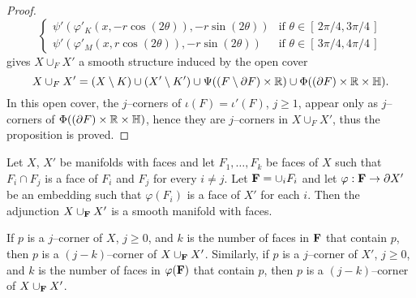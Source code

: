 \begin{proof}
\[\begin{cases}
			\psi'(\varphi'_K(x,-r\cos(2\theta)),-r\sin(2\theta))				
				&	\mbox{if } \theta\in[\,2\pi/4,3\pi/4\,]	\\
			\psi'(\varphi'_M(x,r\cos(2\theta)),-r\sin(2\theta))				
				&	\mbox{if } \theta\in[\,3\pi/4,4\pi/4\,]
		\end{cases}	
	\]
	gives $X\cup_F X'$ a smooth structure induced by the open cover
	\[
		X\cup_F X'=(X\setminus K)\cup(X'\setminus K')\cup\Psi((F\setminus\partial F)\times\mathbb{R})\cup	\Phi((\partial F)\times\mathbb{R}\times\mathbb{H}).
	\]
	In this open cover, the $j$--corners of $\iota(F)=\iota'(F)$, $j\geq 1$, appear only as $j$--corners of $\Phi((\partial F)\times\mathbb{R}\times\mathbb{H})$, hence they are $j$--corners in $X\cup_F X'$, thus the proposition is proved.
\end{proof}

\begin{cor}
	\label{cor:addfaces}
	Let $X$, $X'$ be manifolds with faces and let $F_1,\dots, F_k$ be faces of $X$ such that $F_i\cap F_j$ is a face of $F_i$ and $F_j$ for every $i\neq j$.
	Let ${\bf F}=\cup_i F_i$ and let $\varphi:{\bf F}\to \partial X'$ be an embedding such that $\varphi(F_i)$ is a face of $X'$ for each $i$.
	Then the adjunction $X \cup_{\bf F} X'$ is a smooth manifold with faces.
		
	If $p$ is a $j$--corner of $X$, $j\geq 0$, and $k$ is the number of faces in ${\bf F}$ that contain $p$, then $p$ is a $(j-k)$--corner of $X\cup_{\bf F} X'$.
	Similarly, if $p$ is a $j$--corner of $X'$, $j\geq 0$, and $k$ is the number of faces in $\varphi({\bf F})$ that contain $p$, then $p$ is a $(j-k)$--corner of $X\cup_{\bf F} X'$.
\end{cor}

